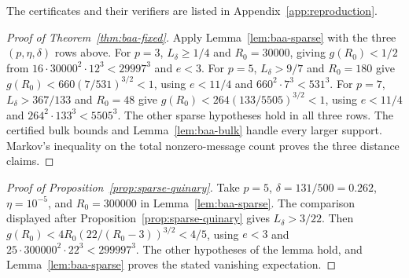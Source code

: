 The certificates and their verifiers are listed in
Appendix~\ref{app:reproduction}.

\begin{proof}[Proof of Theorem~\ref{thm:baa-fixed}]
Apply Lemma~\ref{lem:baa-sparse} with the three $(p,\eta,\delta)$ rows
above. For $p=3$, $L_\delta\ge1/4$ and $R_0=30000$, giving
$g(R_0)<1/2$ from
$16\cdot30000^2\cdot12^3<29997^3$ and $e<3$.
For $p=5$, $L_\delta>9/7$ and $R_0=180$ give
$g(R_0)<660(7/531)^{3/2}<1$, using $e<11/4$ and
$660^2\cdot7^3<531^3$.
For $p=7$, $L_\delta>367/133$ and $R_0=48$ give
$g(R_0)<264(133/5505)^{3/2}<1$, using $e<11/4$ and
$264^2\cdot133^3<5505^3$. The other sparse hypotheses hold in all three rows.
The certified bulk bounds and Lemma~\ref{lem:baa-bulk} handle every larger
support. Markov's inequality on the total nonzero-message count proves
the three distance claims.
\end{proof}

\begin{proof}[Proof of Proposition~\ref{prop:sparse-quinary}]
Take $p=5$, $\delta=131/500=0.262$, $\eta=10^{-5}$, and $R_0=300000$ in
Lemma~\ref{lem:baa-sparse}.
The comparison displayed after Proposition~\ref{prop:sparse-quinary} gives
$L_\delta>3/22$.
Then $g(R_0)<4R_0(22/(R_0-3))^{3/2}<4/5$, using $e<3$ and
$25\cdot300000^2\cdot22^3<299997^3$.  The other hypotheses of the lemma
hold, and Lemma~\ref{lem:baa-sparse} proves the stated vanishing expectation.
\end{proof}
